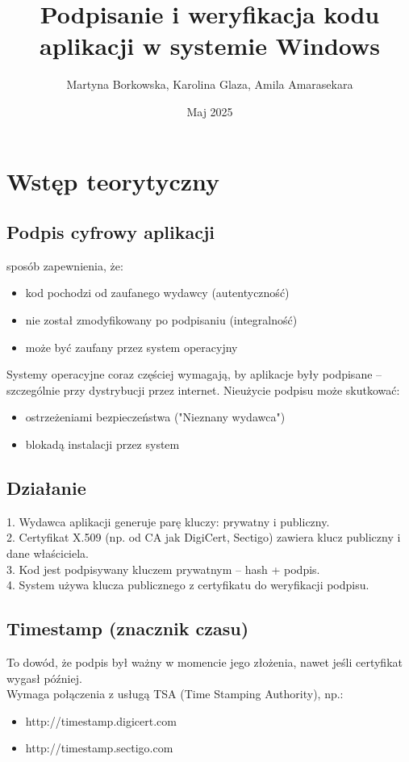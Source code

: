\documentclass{article}
\title{Podpisanie i weryfikacja kodu aplikacji w systemie Windows}
\author{Martyna Borkowska, Karolina Glaza, Amila Amarasekara}
\date{Maj 2025}
\begin{document}
\maketitle

\section*{Wstęp teorytyczny}
\subsection*{Podpis cyfrowy aplikacji}
sposób zapewnienia, że:
\begin{itemize}
    \item kod pochodzi od zaufanego wydawcy (autentyczność)
    \item nie został zmodyfikowany po podpisaniu (integralność)
    \item może być zaufany przez system operacyjny 
\end{itemize}
Systemy operacyjne coraz częściej wymagają, by aplikacje były podpisane – szczególnie przy dystrybucji przez internet. Nieużycie podpisu może skutkować:
\begin{itemize}
    \item ostrzeżeniami bezpieczeństwa ("Nieznany wydawca")
    \item blokadą instalacji przez system
\end{itemize}

\subsection*{Działanie}
1. Wydawca aplikacji generuje parę kluczy: prywatny i publiczny.\\
2. Certyfikat X.509 (np. od CA jak DigiCert, Sectigo) zawiera klucz publiczny i dane właściciela.\\
3. Kod jest podpisywany kluczem prywatnym –  hash + podpis.\\
4. System używa klucza publicznego z certyfikatu do weryfikacji podpisu.

\subsection*{Timestamp (znacznik czasu)}
To dowód, że podpis był ważny w momencie jego złożenia, nawet jeśli certyfikat wygasł później.\\

Wymaga połączenia z usługą TSA (Time Stamping Authority), np.:
\begin{itemize}
    \item http://timestamp.digicert.com
    \item http://timestamp.sectigo.com
\end{itemize}
\end{document}
